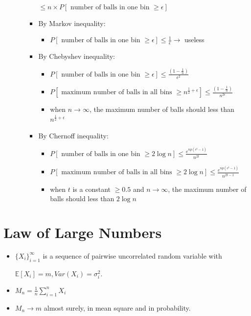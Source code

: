 \documentclass[a4paper]{article}
\begin{document}
\begin{itemize}
\begin{itemize}
\begin{itemize}
                        $\leq n \times P[\text{ number of balls in one bin } \geq \epsilon]$
                    \item By Markov inequality:
                        \begin{itemize}
                            \item $P[\text{ number of balls in one bin } \geq \epsilon] \leq \frac{1}{\epsilon} \rightarrow$ useless
                        \end{itemize}
                    \item By Chebyshev inequality:
                        \begin{itemize}
                            \item $P[\text{ number of balls in one bin } \geq \epsilon] \leq \frac{(1-\frac{1}{n})}{\epsilon^2}$
                            \item $P[\text{ maximum number of balls in all bins } \geq n^{\frac{1}{2} + \epsilon}] \leq \frac{(1-\frac{1}{n})}{n^{2\epsilon}}$
                            \item when $n \rightarrow \infty$, the maximum number of balls should less than $n^{\frac{1}{2} + \epsilon}$
                        \end{itemize}
                    \item By Chernoff inequality:
                        \begin{itemize}
                            \item $P[\text{ number of balls in one bin } \geq 2 \log n] \leq \frac{e^{np(e^{t} - 1)}}{n^{2t}}$
                            \item $P[\text{ maximum number of balls in all bins } \geq 2 \log n] \leq \frac{e^{np(e^{t} - 1)}}{n^{2t - 1}}$
                            \item when $t$ is a constant $\geq 0.5$ and $n \rightarrow \infty$, the maximum number of balls should less than $2 \log n$
                        \end{itemize}
                \end{itemize}
        \end{itemize}
\end{itemize}

\section{Law of Large Numbers}
\begin{itemize}
    \item $\{X_i\}_{i = 1}^\infty$ is a sequence of pairwise uncorrelated random variable with

        $\mathbb{E}[X_i] = m, \mathit{Var}(X_i) = \sigma_i^2$.
    \item $M_n = \frac{1}{n}\sum_{i = 1}^n X_i$
    \item $M_n \rightarrow m$ almost surely, in mean square and in probability.
\end{itemize}
\end{document}
